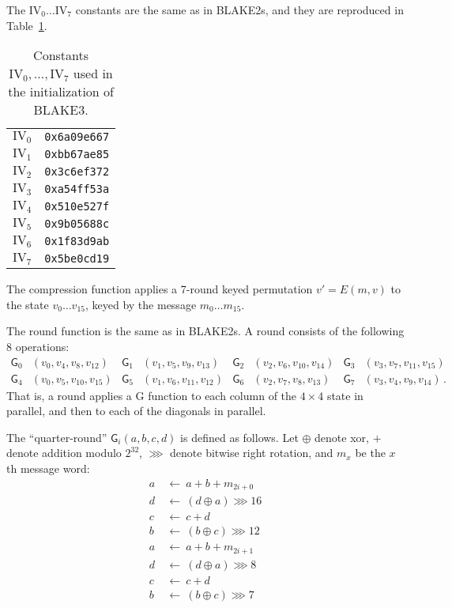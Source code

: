 \documentclass[11pt,notitlepage,a4paper]{article}
\newcommand{\GG}{\mathsf{G}}
\newcommand{\IV}{\text{IV}}
\begin{document}
The $\IV_{0} \ldots \IV_{7}$ constants are the same as in
BLAKE2s, and they are reproduced in Table~\ref{tab:constants}.

\begin{table}
  \caption{Constants $\IV_0,\dots,\IV_7$ used in the initialization of BLAKE3.}%
  \label{tab:constants}
  \centering
  \begin{tabular}{cc}
    \toprule
    $\IV_0$ & \texttt{0x6a09e667} \\
    $\IV_1$ & \texttt{0xbb67ae85} \\
    $\IV_2$ & \texttt{0x3c6ef372} \\
    $\IV_3$ & \texttt{0xa54ff53a} \\
    $\IV_4$ & \texttt{0x510e527f} \\
    $\IV_5$ & \texttt{0x9b05688c} \\
    $\IV_6$ & \texttt{0x1f83d9ab} \\
    $\IV_7$ & \texttt{0x5be0cd19} \\
    \bottomrule
  \end{tabular}
\end{table}

The compression function applies a 7-round keyed permutation $v' = E(m, v)$ to
the state $v_0 \dots v_{15}$, keyed by the message $m_0 \dots m_{15}$. 

The round function is the same as in BLAKE2s. A round consists of the following 8 operations:
\begin{align*}
\GG_{0}&(v_{0}, v_{4}, v_{8}, v_{12}) &
\GG_{1}&(v_{1}, v_{5}, v_{9}, v_{13}) &
\GG_{2}&(v_{2}, v_{6}, v_{10}, v_{14}) &
\GG_{3}&(v_{3}, v_{7}, v_{11}, v_{15}) \\
\GG_{4}&(v_{0}, v_{5}, v_{10}, v_{15}) &
\GG_{5}&(v_{1}, v_{6}, v_{11}, v_{12}) &
\GG_{6}&(v_{2}, v_{7}, v_{8}, v_{13}) &
\GG_{7}&(v_{3}, v_{4}, v_{9}, v_{14})\,.
\end{align*}
That is, a round applies a G function to each column of the $4\times 4$ state in parallel,
and then to each of the diagonals in parallel. 

The ``quarter-round'' $\GG_i(a, b, c, d)$ is
defined as follows. Let $\oplus$ denote xor, $+$ denote addition modulo $2^{32}$, $\ggg$ denote
bitwise right rotation, and $m_{x}$ be the $x$th message word:
\begin{align*}
a \ & \leftarrow \ a + b + m_{2i+0} \\
d \ & \leftarrow \ (d \oplus a) \ggg 16 \\
c \ & \leftarrow \ c + d \\
b \ & \leftarrow \ (b \oplus c) \ggg 12 \\
a \ & \leftarrow \ a + b + m_{2i+1} \\
d \ & \leftarrow \ (d \oplus a) \ggg 8 \\
c \ & \leftarrow \ c + d \\
b \ & \leftarrow \ (b \oplus c) \ggg 7
\end{align*}
\end{document}
